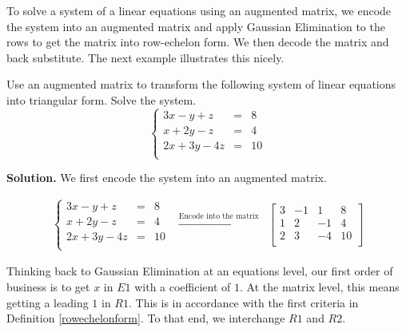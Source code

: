 \documentclass{ximera}
\begin{document}

\smallskip

To solve a system of a linear equations using an augmented matrix, we encode the system into an augmented matrix and  apply Gaussian Elimination to the rows to get the matrix into row-echelon form.  We then decode the matrix and back substitute.  The next example illustrates this nicely.

\begin{example}  \label{GaussExMatrix} Use an augmented matrix to transform the following system of linear equations into triangular form. Solve the system.
\[\left\{ \begin{array}{rcl} 3x  - y  + z & = & 8 \\ x +  2y  -  z & = & 4 \\  2x+ 3y - 4z & = & 10 \\  \end{array} \right.\]

{\bf Solution.}  We first encode the system into an augmented matrix.

\[ \begin{array}{ccc}

\left\{ \begin{array}{rcl} 3x  - y  + z & = & 8 \\ x +  2y  -  z & = & 4 \\  2x+ 3y - 4z & = & 10 \\  \end{array} \right.

&

\xrightarrow{\text{Encode into the matrix}}

&

 \left[ \begin{array}{rrr|r} 3 & -1 & 1 & 8 \\ 1 & 2 & -1 & 4 \\ 2 & 3 & -4 & 10 \\ \end{array} \right]
 
 
 \end{array}\]

Thinking back to Gaussian Elimination at an equations level, our first order of business is to get $x$ in $E1$ with a coefficient of $1$.  At the matrix level, this means getting a leading $1$ in $R1$.  This is in accordance with the first criteria in Definition \ref{rowechelonform}.  To that end, we interchange $R1$ and $R2$.  

\[\begin{array}{ccc}


\end{array}\]
\end{example}
\end{document}
